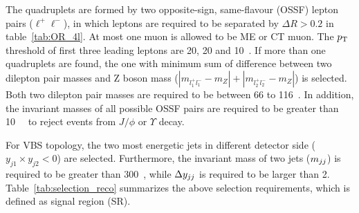 The \llll quadruplets are formed by two opposite-sign, same-flavour (OSSF) lepton pairs ($\ell^{+}\ell^{-}$),
in which leptons are required to be separated by $\Delta R > 0.2$ in table~\ref{tab:OR_4l}.
At most one muon is allowed to be ME or CT muon.
The $p_{\text{T}}$ threshold of first three leading leptons are 20, 20 and 10~\gev.
If more than one quadruplets are found, the one with minimum sum of difference between two dilepton pair masses and Z boson mass 
($|m_{l_{1}^{+}l_{1}^{-}} - m_{Z}| + |m_{l_{2}^{+}l_{2}^{-}} - m_{Z}|$) is selected.
Both two dilepton pair masses are required to be between 66 to 116~\gev.
In addition, the invariant masses of all possible OSSF pairs are required to be greater than 10~\gev~ to reject events from $J/\phi$ or $\Upsilon$ decay.

For VBS topology, the two most energetic jets in different detector side ($y_{j1} \times y_{j2} < 0$) are selected.
Furthermore, the invariant mass of two jets ($m_{jj}$) is required to be greater than 300~\gev, 
while $\Delta y_{jj}$ is required to be larger than 2.
Table~\ref{tab:selection_reco} summarizes the above selection requirements, which is defined as signal region (SR).

